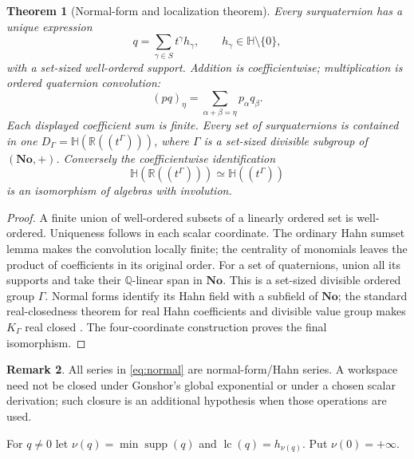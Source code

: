 \documentclass[11pt,letterpaper]{article}
\newtheorem{theorem}{Theorem}[section]
\theoremstyle{definition}
\newtheorem{remark}[theorem]{Remark}
\newcommand{\No}{\mathbf{No}}
\newcommand{\R}{\mathbb R}
\newcommand{\Q}{\mathbb Q}
\newcommand{\HH}{\mathbb H}
\newcommand{\val}{\nu}
\DeclareMathOperator{\supp}{supp}
\begin{document}
\begin{theorem}[Normal-form and localization theorem]
\label{thm:normal}
Every surquaternion has a unique expression
\begin{equation}
 q=\sum_{\gamma\in S}t^\gamma h_\gamma,
 \qquad h_\gamma\in\HH\setminus\{0\},
 \label{eq:normal}
\end{equation}
with a set-sized well-ordered support. Addition is coefficientwise;
multiplication is ordered quaternion convolution:
\[
 (pq)_\eta=\sum_{\alpha+\beta=\eta}p_\alpha q_\beta.
\]
Each displayed coefficient sum is finite. Every set of surquaternions is
contained in one $D_\Gamma=\HH(\R((t^\Gamma)))$, where $\Gamma$ is a set-sized
divisible subgroup of $(\No,+)$. Conversely the coefficientwise identification
\[
 \HH(\R((t^\Gamma)))\simeq\HH((t^\Gamma))
\]
is an isomorphism of algebras with involution.
\end{theorem}
\begin{proof}
A finite union of well-ordered subsets of a linearly ordered set is
well-ordered. Uniqueness follows in each scalar coordinate. The ordinary Hahn
sumset lemma makes the convolution locally finite; the centrality of monomials
leaves the product of coefficients in its original order. For a set of
quaternions, union all its supports and take their $\Q$-linear span in $\No$.
This is a set-sized divisible ordered group $\Gamma$. Normal forms identify
its Hahn field with a subfield of $\No$; the standard real-closedness theorem
for real Hahn coefficients and divisible value group makes $K_\Gamma$ real
closed \cite{alling,ek}. The four-coordinate construction proves the final
isomorphism.
\end{proof}

\begin{remark}
All series in
\eqref{eq:normal} are normal-form/Hahn series. A workspace need not be closed
under Gonshor's global exponential or under a chosen scalar derivation; such
closure is an additional hypothesis when those operations are used.
\end{remark}

For $q\ne0$ let $\val(q)=\min\supp(q)$ and
$\operatorname{lc}(q)=h_{\val(q)}$. Put $\val(0)=+\infty$.
\end{document}
